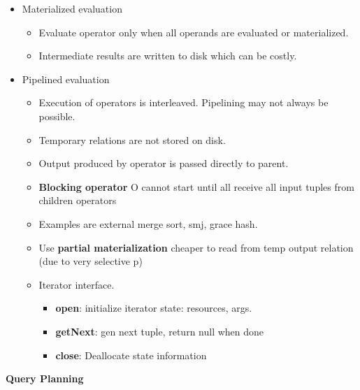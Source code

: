 \documentclass[9pt, landscape]{extarticle}
\begin{document}
\begin{multicols*}{4}
  \begin{itemize}
    \item Materialized evaluation
    \begin{itemize}
      \item Evaluate operator only when all operands are evaluated or materialized.
      \item Intermediate results are written to disk which can be costly.
    \end{itemize}
    \item Pipelined evaluation
    \begin{itemize}
      \item Execution of operators is interleaved. Pipelining may not always be possible. 
      \item Temporary relations are not stored on disk.
      \item Output produced by operator is passed directly to parent.
      \item \textbf{Blocking operator} O cannot start until all receive all input tuples from children operators
      \item Examples are external merge sort, smj, grace hash.
      \item Use \textbf{partial materialization} cheaper to read from temp output relation (due to very selective p)
      \item Iterator interface.
      \begin{itemize}
        \item \textbf{open}: initialize iterator state: resources, args.
        \item \textbf{getNext}: gen next tuple, return null when done
        \item \textbf{close}: Deallocate state information
      \end{itemize}
    \end{itemize}
  \end{itemize}
  
  \textbf{Query Planning}


\end{multicols*}
\end{document}
